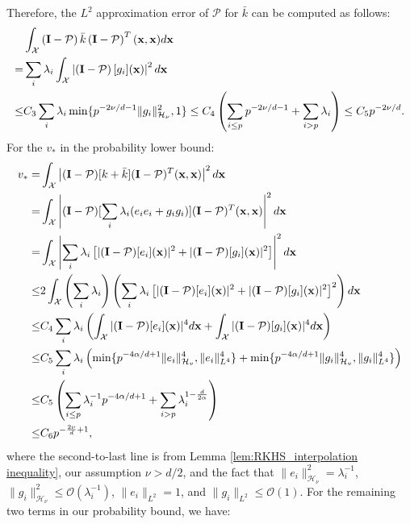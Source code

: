 \documentclass[aos,preprint]{imsart}
\theoremstyle{plain}
\DeclareMathOperator{\E}{\mathbb E}
\newcommand{\CalO}{\mathcal O}
\newcommand{\CalH}{\mathcal H}
\newcommand{\CalX}{\mathcal X}
\newcommand{\CalP}{\mathcal P}
\newcommand{\BI}{\bold I}
\newcommand{\Bx}{\bold x}
\newcommand{\BFx}{\bold x}
\newcommand{\BB}{\bold B}
\theoremstyle{remark}
\begin{document}
\begin{appendix}
Therefore, the $L^2$ approximation error of $\CalP$ for $\bar{k}$ can be computed as follows:
\begin{align*}
    &\int_\CalX\left(\BI-\CalP\right)\bar{k}\left(\BI-\CalP\right)^T(\Bx,\Bx)d\Bx\\
    =& \sum_i\lambda_i \int_\CalX\left|\left(\BI-\CalP\right)[g_i](\Bx) \right|^2d\BFx\\
    \leq & C_3 \sum_i \lambda_i \min\{p^{-{2\nu}/{d}-1}\|g_i\|^2_{\CalH_\nu},1\}\leq  C_4\left(\sum_{i\leq p}  p^{-{2\nu}/{d}-1}+\sum_{i> p}  \lambda_i\right)
    \leq  C_5 p^{-2\nu/d}.
\end{align*}
For the  $v_*$ in the probability lower bound:
\begin{align}
    v
    _*=&\int_\CalX \left| (\BI-\CalP)[k+\bar{k}](\BI-\CalP)^T(\Bx,\Bx)\right|^2d\Bx\nonumber\\
    =& \int_\CalX\left|(\BI-\CalP)[\sum_i\lambda_i(e_ie_i+g_ig_i)](\BI-\CalP)^T(\Bx,\Bx)\right|^2d\Bx\nonumber\\
    =& \int_\CalX\left|\sum_i \lambda_i \left[|(\BI-\CalP)[e_i](\Bx)|^2+|(\BI-\CalP)[g_i](\Bx)|^2\right]\right|^2d\Bx\nonumber\\
    \leq & 2\int_\CalX \left(\sum_i \lambda_i\right)\left(\sum_i\lambda_i\left[|(\BI-\CalP)[e_i](\Bx)|^2+|(\BI-\CalP)[g_i](\Bx)|^2\right]^2\right)d\Bx\nonumber\\
    \leq & C_4 \sum_i\lambda_i\left(\int_\CalX  |(\BI-\CalP)[e_i](\Bx)|^4d\Bx+\int_\CalX  |(\BI-\CalP)[g_i](\Bx)|^4d\Bx\right)\nonumber\\
    \leq & C_5\sum_i\lambda_i \left(\min\{p^{-4\alpha/d+1}\|e_i\|_{\CalH_v}^4,\|e_i\|_{L^4}^4\}+\min\{p^{-4\alpha/d+1}\|g_i\|_{\CalH_v}^4,\|g_i\|_{L^4}^4\}\right) \nonumber\\
    \leq & C_5\left(\sum_{i\leq p} \lambda_i^{-1}p^{-4\alpha/d+1}+\sum_{i>p}\lambda_i^{1-\frac{d}{2\alpha }}\right)\nonumber\\
    \leq & C_6 p^{-\frac{2\nu}{d}+1}\nonumber,
\end{align}
where the second-to-last line is from Lemma \ref{lem:RKHS_interpolation inequality}, our assumption $\nu>d/2$,  and the fact that $\|e_i\|^2_{\CalH_\nu}=\lambda_i^{-1}$, $\|g_i\|^2_{\CalH_\nu}\leq \CalO(\lambda_i^{-1})$, $\|e_i\|_{L^2}=1$, and $\|g_i\|_{L^2}\leq \CalO(1)$. For the remaining two terms in our probability bound, we have:

\end{appendix}
\end{document}
